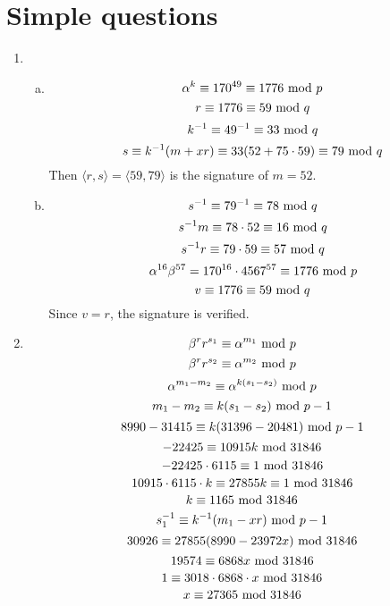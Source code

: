 \documentclass{article}
\renewcommand{\mod}{{\rm\ mod\ }}
\begin{document}
\section{Simple questions}
\begin{enumerate}
\item
\begin{enumerate}[(a)]
\item
$$\alpha^k \equiv 170^{49} \equiv 1776 \mod p$$
$$r \equiv 1776 \equiv 59 \mod q$$
$$k^{-1} \equiv 49^{-1} \equiv 33 \mod q$$
$$s \equiv k^{-1}(m+xr) \equiv 33(52+75\cdot59)\equiv 79 \mod q$$
Then $\langle r,s\rangle=\langle 59,79\rangle$ is the signature of $m=52$.
\item
$$s^{-1} \equiv 79^{-1} \equiv 78 \mod q$$
$$s^{-1}m \equiv 78\cdot52 \equiv 16 \mod q$$
$$s^{-1}r \equiv 79\cdot59 \equiv 57 \mod q$$
$$\alpha^{16}\beta^{57}=170^{16}\cdot 4567^{57} \equiv 1776 \mod p$$
$$v \equiv 1776 \equiv 59 \mod q$$
Since $v=r$, the signature is verified.
\end{enumerate}

\item
$$\beta^r r^{s_1} \equiv \alpha^{m_1} \mod p$$
$$\beta^r r^{s_2} \equiv \alpha^{m_2} \mod p$$
$$\alpha^{m_1-m_2} \equiv \alpha^{k(s_1-s_2)} \mod p$$
$$m_1-m_2 \equiv k(s_1-s_2) \mod p-1$$
$$8990-31415 \equiv k(31396-20481) \mod p-1$$
$$-22425 \equiv 10915k \mod 31846$$
$$-22425 \cdot 6115 \equiv 1 \mod 31846$$
$$10915 \cdot 6115 \cdot k \equiv 27855k \equiv 1 \mod 31846$$
$$k \equiv 1165 \mod 31846$$
$$s_1^{-1} \equiv k^{-1}(m_1-xr) \mod p-1$$
$$30926 \equiv 27855(8990-23972x) \mod 31846$$
$$19574 \equiv 6868x \mod 31846$$
$$1 \equiv 3018\cdot6868\cdot x \mod 31846$$
$$x \equiv 27365 \mod 31846$$
\end{enumerate}
\end{document}

